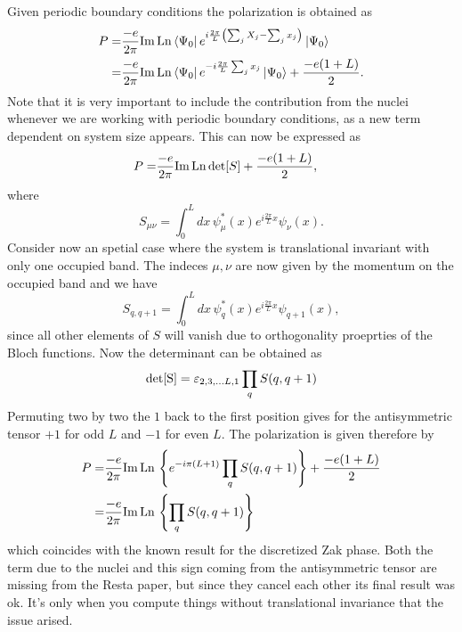\documentclass[twocolumn,amsmath,longbibliography,amssymb,superscriptaddress]{revtex4-1}
\begin{document}
Given periodic boundary conditions the polarization is obtained as
\begin{align*}
P =& \frac{-e}{2\pi}{\rm Im}\,{\rm Ln}\bra{\Psi_0}e^{i\frac{2\pi}{L} \left(\sum_j X_j - \sum_j  x_j\right)}\ket{\Psi_0} \\
=&\frac{-e}{2\pi}{\rm Im}\,{\rm Ln}\bra{\Psi_0}e^{-i\frac{2\pi}{L} \sum_j  x_j}\ket{\Psi_0}+\frac{-e(1+L)}{2}.
\end{align*}
Note that it is very important to include the contribution from the nuclei whenever we are working with periodic boundary conditions, as a new term dependent on system size appears. This can now be expressed as
\begin{align*}
P =& \frac{-e}{2\pi}{\rm Im}\,{\rm Ln} \, {\rm det}[S]+\frac{-e(1+L)}{2},
\end{align*}
where
\begin{equation}
S_{\mu \nu} = \int_0^L dx \, \psi^*_{\mu}(x)e^{i\frac{2\pi}{L}x}\psi_\nu(x).
\end{equation}
Consider now an spetial case where the system is translational invariant with only one occupied band. The indeces $\mu,\nu$ are now given by the momentum on the occupied band and we have
\begin{equation}
S_{q,q+1} = \int_0^L dx \, \psi^*_{q}(x)e^{i\frac{2\pi}{L}x}\psi_{q+1}(x),
\end{equation}
since all other elements of $S$ will vanish due to orthogonality proeprties of the Bloch functions. Now the determinant can be obtained as
\begin{equation}
{\rm det[S]} = \varepsilon_{2,3,...L,1}\prod_q S(q,q+1)
\end{equation}
Permuting two by two the $1$ back to the first position gives for the antisymmetric tensor $+1$ for odd $L$ and $-1$ for even $L$. The polarization is given therefore by
\begin{align*}
P =& \frac{-e}{2\pi}{\rm Im}\,{\rm Ln} \, \left\{e^{-i \pi (L+1)}\prod_q S(q,q+1)\right\}+\frac{-e(1+L)}{2} \\
=& \frac{-e}{2\pi}{\rm Im}\,{\rm Ln} \, \left\{\prod_q S(q,q+1)\right\}
\end{align*} 
which coincides with the known result for the discretized Zak phase. Both the term due to the nuclei and this sign coming from the antisymmetric tensor are missing from the Resta paper, but since they cancel each other its final result was ok. It's only when you compute things without translational invariance that the issue arised. 
\end{document}
